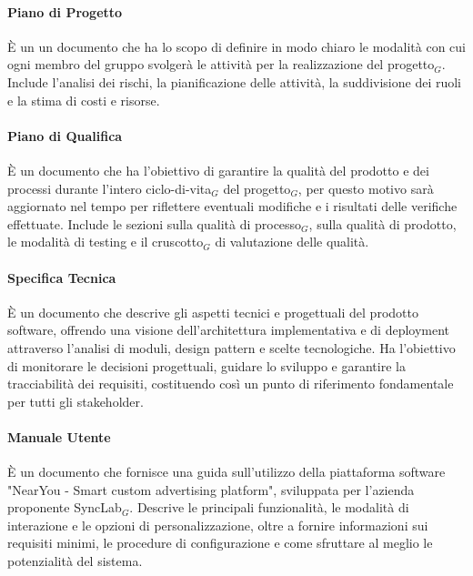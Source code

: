 \documentclass[10pt]{article}
\begin{document}
\begin{justify}
        \paragraph{Piano di Progetto}
        È un un documento che ha lo scopo di definire in modo chiaro le modalità con cui ogni membro del gruppo svolgerà le attività per la realizzazione del progetto$_G$. Include l'analisi dei rischi, la pianificazione delle attività, la suddivisione dei ruoli e la stima di costi e risorse.\\

        \paragraph{Piano di Qualifica}
        È un documento che ha l'obiettivo di garantire la qualità del prodotto e dei processi durante l'intero ciclo-di-vita$_G$ del progetto$_G$, per questo motivo sarà aggiornato nel tempo per riflettere eventuali modifiche e i risultati delle verifiche effettuate. Include le sezioni sulla qualità di processo$_G$, sulla qualità di prodotto, le modalità di testing e il cruscotto$_G$ di valutazione delle qualità.\\

        \paragraph{Specifica Tecnica}
        È un documento che descrive gli aspetti tecnici e progettuali del prodotto software, offrendo una visione dell'architettura implementativa e di deployment attraverso l'analisi di moduli, design pattern e scelte tecnologiche. Ha l'obiettivo di monitorare le decisioni progettuali, guidare lo sviluppo e garantire la tracciabilità dei requisiti, costituendo così un punto di riferimento fondamentale per tutti gli stakeholder.\\

        \paragraph{Manuale Utente}
        È un documento che fornisce una guida sull'utilizzo della piattaforma software "NearYou - Smart custom advertising platform", sviluppata per l'azienda proponente SyncLab$_G$. Descrive le principali funzionalità, le modalità di interazione e le opzioni di personalizzazione, oltre a fornire informazioni sui requisiti minimi, le procedure di configurazione e come sfruttare al meglio le potenzialità del sistema.\\


\end{justify}
\end{document}
